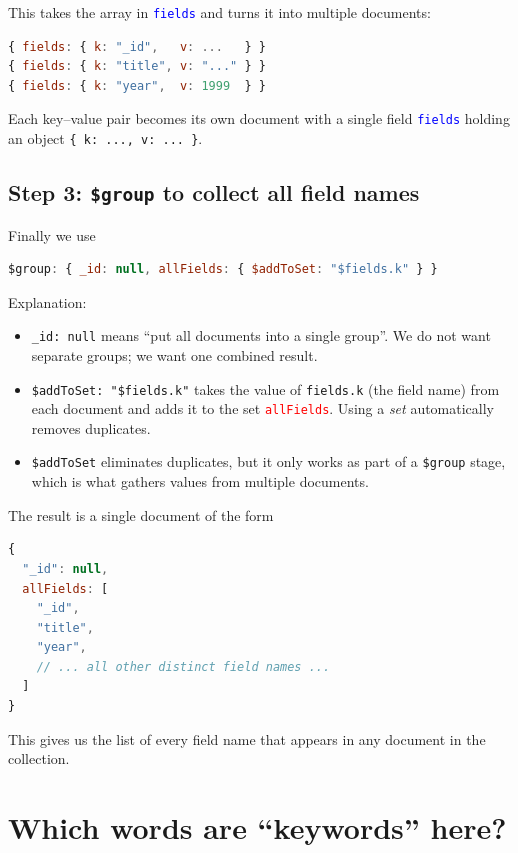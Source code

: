 \documentclass[9pt]{article}
\begin{document}
This takes the array in \texttt{\textcolor{blue}{fields}} and turns it into multiple documents:

\begin{lstlisting}[language=JavaScript]
{ fields: { k: "_id",   v: ...   } }
{ fields: { k: "title", v: "..." } }
{ fields: { k: "year",  v: 1999  } }
\end{lstlisting}

Each key--value pair becomes its own document with a single field
\texttt{\textcolor{blue}{fields}} holding an object \texttt{\{ k: ..., v: ... \}}.

\subsection*{Step 3: \texttt{\$group} to collect all field names}

Finally we use
\begin{lstlisting}[language=JavaScript]
$group: { _id: null, allFields: { $addToSet: "$fields.k" } }
\end{lstlisting}

Explanation:
\begin{itemize}
  \item \texttt{\_id: null} means ``put all documents into a single group''. We do not
        want separate groups; we want one combined result.
  \item \texttt{\$addToSet: "\$fields.k"} takes the value of \texttt{fields.k}
        (the field name) from each document and adds it to the set
        \texttt{\textcolor{red}{allFields}}. Using a \emph{set} automatically removes duplicates.
  \item \texttt{\$addToSet} eliminates duplicates, but it only works as part of a \texttt{\$group} stage, which is what gathers values from multiple documents.
\end{itemize}

The result is a single document of the form
\begin{lstlisting}[language=JavaScript]
{
  "_id": null,
  allFields: [
    "_id",
    "title",
    "year",
    // ... all other distinct field names ...
  ]
}
\end{lstlisting}

This gives us the list of every field name that appears in any document
in the collection.

\section*{Which words are ``keywords'' here?}
\end{document}
